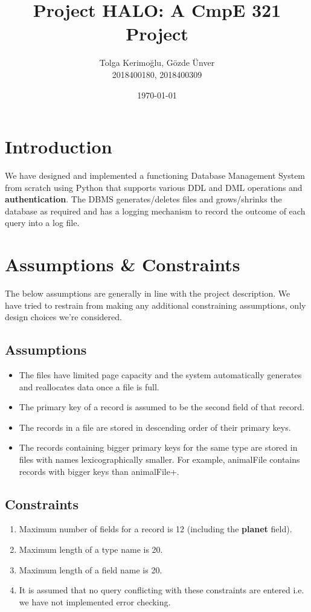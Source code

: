 \documentclass{article}
\title{Project HALO: A CmpE 321 Project}
\date{\today}
\author{Tolga Kerimoğlu, Gözde Ünver \\ 2018400180, 2018400309}
\begin{document}
\maketitle
\newpage
\tableofcontents
\newpage
\section{Introduction}
\label{sec:introduction}
We have designed and implemented a functioning Database Management System from scratch using Python that supports various DDL and DML operations and \textbf{authentication}. The DBMS generates/deletes files and grows/shrinks the database as required and has a logging mechanism to record the outcome of each query into a log file.
\section{Assumptions \& Constraints}
\label{sec:ass-and-const}
The below assumptions are generally in line with the project description. We have tried to restrain from making any additional constraining assumptions, only design choices we're considered.
\subsection{Assumptions}
\begin{itemize}
    \item The files have limited page capacity and the system automatically generates and reallocates data once a file is full.
    \item The primary key of a record is assumed to be the second field of that record.
    \item The records in a file are stored in descending order of their primary keys.
    \item The records containing bigger primary keys for the same type are stored in files with names lexicographically smaller. For example, animalFile contains records with bigger keys than animalFile+.
\end{itemize}
\subsection{Constraints}
\begin{enumerate}
    \item Maximum number of fields for a record is 12 (including the \textbf{planet} field).
    \item Maximum length of a type name is 20.
    \item Maximum length of a field name is 20.
    \item It is assumed that no query conflicting with these constraints are entered i.e. we have not implemented error checking.
\end{enumerate}
\end{document}
